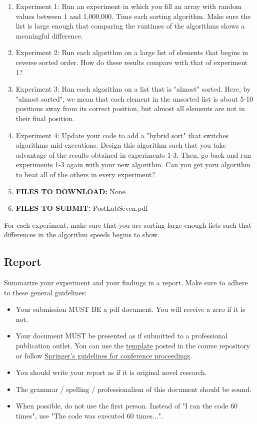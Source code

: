 \documentclass[paper=a4, fontsize=11pt, parskip=full]{scrartcl} %
\numberwithin{equation}{section} %
\numberwithin{figure}{section} %
\numberwithin{table}{section} %
\begin{document}
\begin{enumerate}
	\item Experiment 1: Run an experiment in which you fill an array with random values between 1 and 1,000,000. Time each sorting algorithm. Make sure the list is large enough that comparing the runtimes of the algorithms shows a meaningful difference.
	\item Experiment 2: Run each algorithm on a large list of elements that begins in reverse sorted order. How do these results compare with that of experiment 1?
	\item Experiment 3: Run each algorithm on a list that is "almost" sorted. Here, by "almost sorted", we mean that each element in the unsorted list is about 5-10 positions away from its correct position, but almost all elements are not in their final position. 
	\item Experiment 4: Update your code to add a "hybrid sort" that switches algorithms mid-executions. Design this algorithm such that you take advantage of the results obtained in experiments 1-3. Then, go back and run experiments 1-3 again with your new algorithm. Can you get yoru algorithm to beat all of the others in every experiment?
	\item \textbf{FILES TO DOWNLOAD:} None
	\item \textbf{FILES TO SUBMIT:} PostLabSeven.pdf
\end{enumerate}

For each experiment, make sure that you are sorting large enough lists such that differences in the algorithm speeds begins to show.

\subsection{Report}

Summarize your experiment and your findings in a report. Make sure to adhere to these general guidelines:

\begin{itemize}
	\item Your submission MUST BE a pdf document. You will receive a zero if it is not.
	\item Your document MUST be presented as if submitted to a professional publication outlet. You can use the \href{https://markfloryan.github.io/dsa1/labs/WordPaperTemplate.zip}{template} posted in the course repository or follow \href{https://www.springer.com/us/computer-science/lncs/conference-proceedings-guidelines}{Springer's guidelines for conference proceedings}.
	\item You should write your report as if it is original novel research.
	\item The grammar / spelling / professionalism of this document should be sound.
	\item When possible, do not use the first person. Instead of "I ran the code 60 times", use "The code was executed 60 times...".
\end{itemize}
\end{document}

